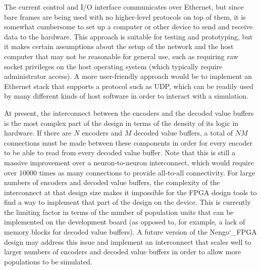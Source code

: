 \documentclass[english]{article}
\newcommand{\design}{Nengo\char`_FPGA}  %
\begin{document}
The current control and I/O interface communicates over Ethernet, but since bare frames are being used with no higher-level protocols on top of them,
it is somewhat cumbersome to set up a computer or other device to send and receive data to the hardware.
This approach is suitable for testing and prototyping, but it makes certain assumptions about the setup of the network and the host computer that
may not be reasonable for general use, such as requiring raw socket privileges on the host operating system (which typically require administrator access).
A more user-friendly approach would be to implement an Ethernet stack that supports a protocol such as UDP, which can be readily used by many different
kinds of host software in order to interact with a simulation.

At present, the interconnect between the encoders and the decoded value
buffers is the most complex part of the design in terms of the density of its logic
in hardware. If there are $N$ encoders and $M$ decoded value buffers, a total of
$NM$ connections must be made between these components in order for every
encoder to be able to read from every decoded value buffer.
Note that this is still a massive improvement over a neuron-to-neuron interconnect,
which would require over 10000 times as many connections to provide all-to-all connectivity.
For large numbers of encoders and decoded value buffers, the complexity of the interconnect at
that design size makes it impossible for the FPGA design tools to find a way to
implement that part of the design on the device. This is currently the limiting
factor in terms of the number of population units that can be implemented on
the development board (as opposed to, for example, a lack of memory blocks for
decoded value buffers). A future version of the \design{} design may address
this issue and implement an interconnect that scales well to larger numbers of
encoders and decoded value buffers in order to allow more populations to be
simulated. %



\end{document}
